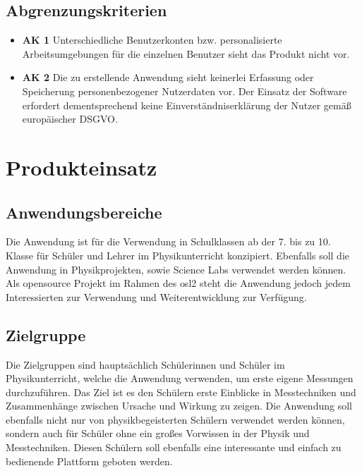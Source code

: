\documentclass[parskip=full]{scrartcl}
\begin{document}
\subsection{Abgrenzungskriterien}

\begin{itemize}
	
	\item \textbf{AK 1} Unterschiedliche Benutzerkonten bzw. personalisierte Arbeitsumgebungen  für die einzelnen Benutzer sieht das Produkt nicht vor. 
	
	\item \textbf{AK 2} Die zu erstellende Anwendung sieht keinerlei Erfassung oder Speicherung personenbezogener Nutzerdaten vor. Der Einsatz der Software erfordert dementsprechend keine Einverständniserklärung der Nutzer gemäß europäischer \gls{DSGVO}.
	
\end{itemize}

\clearpage
\section{Produkteinsatz}\label{produkteinsatz}

\subsection{Anwendungsbereiche}

Die Anwendung ist für die Verwendung in Schulklassen ab der 7. bis zu 10. Klasse für Schüler und Lehrer im Physikunterricht konzipiert. Ebenfalls soll die Anwendung in Physikprojekten, sowie \gls{Science Labs} verwendet werden können. 
Als \gls{opensource} Projekt im Rahmen des \gls{osl2} steht die Anwendung jedoch jedem Interessierten zur Verwendung und Weiterentwicklung zur Verfügung.


\subsection{Zielgruppe}

Die Zielgruppen sind hauptsächlich Schülerinnen und Schüler im Physikunterricht, welche die Anwendung verwenden, um erste eigene Messungen durchzuführen. Das Ziel ist es den Schülern erste Einblicke in Messtechniken und Zusammenhänge zwischen Ursache und Wirkung zu zeigen. 
Die Anwendung soll ebenfalls nicht nur von physikbegeisterten Schülern verwendet werden können, sondern auch für Schüler ohne ein großes Vorwissen in der Physik und Messtechniken. Diesen Schülern soll ebenfalls eine interessante und einfach zu bedienende Plattform geboten werden.
\end{document}
